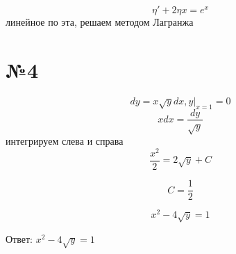 \documentclass{article}
\begin{document}
\begin{equation*}
    \eta '+2\eta x=e^x
\end{equation*}
линейное по эта, решаем методом Лагранжа\\


\section*{№4}

\begin{equation*}
    dy = x\sqrt{y} dx,y|_{x=1} = 0
\end{equation*}
\begin{equation*}
    xdx = \frac{dy}{\sqrt{y}}
\end{equation*}
интегрируем слева и справа
\begin{equation*}
    \frac{x^2}{2} = 2\sqrt{y} + C
\end{equation*}

\begin{equation*}
    C = \frac{1}{2}
\end{equation*}

\begin{equation*}
    x^2 - 4\sqrt{y} = 1
\end{equation*}

Ответ: $x^2 - 4\sqrt{y} = 1$
\end{document}
